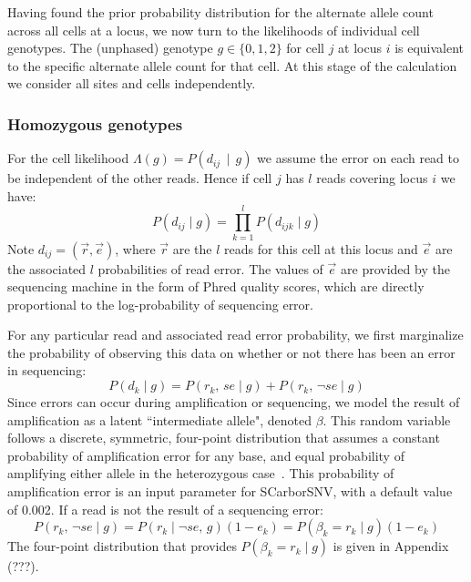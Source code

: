 \documentclass[../../main.tex]{subfiles}
\begin{document}

Having found the prior probability distribution for the alternate allele count across all cells at a locus, we now turn to the likelihoods of individual cell genotypes.
The (unphased) genotype $g\in\{0,1,2\}$ for cell $j$ at locus $i$ is equivalent to the specific alternate allele count for that cell.
At this stage of the calculation we consider all sites and cells independently.
\subsubsection*{Homozygous genotypes}
For the cell likelihood $\Lambda(g) = P(d_{ij}\,\mid\,g)$ we assume the error on each read to be independent of the other reads.
Hence if cell $j$ has $l$ reads covering locus $i$ we have:
\begin{equation*}
    P(d_{ij}\mid g) = \prod_{k=1}^l P(d_{ijk} \mid g)
\end{equation*}
Note $d_{ij}=(\vec{r},\vec{e})$, where $\vec{r}$ are the $l$ reads for this cell at this locus and $\vec{e}$ are the associated $l$ probabilities of read error.
The values of $\vec{e}$ are provided by the sequencing machine in the form of Phred quality scores, which are directly proportional to the log-probability of sequencing error. 

For any particular read and associated read error probability, we first marginalize the probability of observing this data on whether or not there has been an error in sequencing:
\begin{equation*}
    P(d_{k} \mid g) =  P(r_k,\,se \mid g) + P(r_k,\,\neg se \mid g)
\end{equation*}
Since errors can occur during amplification or sequencing, we model the result of amplification as a latent ``intermediate allele", denoted $\beta$.
This random variable follows a discrete, symmetric, four-point distribution that assumes a constant probability of amplification error for any base, and equal probability of amplifying either allele in the heterozygous case~\cite{monovar}.
This probability of amplification error is an input parameter for SCarborSNV, with a default value of 0.002.
If a read is not the result of a sequencing error:
\begin{equation*}
    P(r_k,\,\neg se \mid g) = P(r_k\mid \neg se ,\, g)(1-e_k)=P(\beta_k=r_k\mid g)(1-e_k) 
\end{equation*}
The four-point distribution that provides $P(\beta_k=r_k\mid g)$ is given in Appendix (???).
\end{document}
